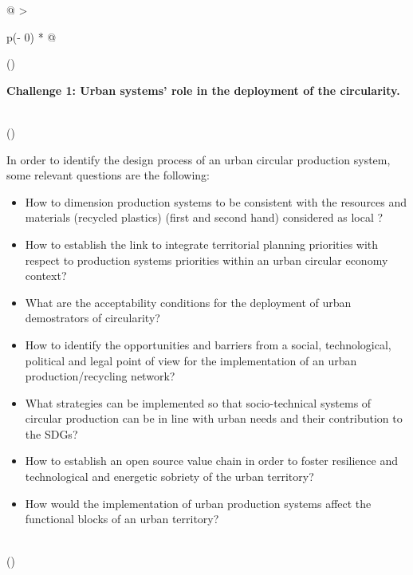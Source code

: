 \documentclass[
  12pt,
  a4paperpaper,
  onecolumn]{article}
\begin{document}
\begin{longtable}[]{@{}
  >{\raggedright\arraybackslash}p{(\columnwidth - 0\tabcolsep) * }@{}}
\toprule()
\begin{minipage}[b]{\linewidth}\raggedright
\textbf{Challenge 1: Urban systems' role in the deployment of the
circularity.}
\end{minipage} \\
\midrule()
\endhead
\begin{minipage}[t]{\linewidth}\raggedright
In order to identify the design process of an urban circular production
system, some relevant questions are the following:

\begin{itemize}
\item
  How to dimension production systems to be consistent with the
  resources and materials (recycled plastics) (first and second hand)
  considered as local ?
\item
  How to establish the link to integrate territorial planning priorities
  with respect to production systems priorities within an urban circular
  economy context?
\item
  What are the acceptability conditions for the deployment of urban
  demostrators of circularity?
\item
  How to identify the opportunities and barriers from a social,
  technological, political and legal point of view for the
  implementation of an urban production/recycling network?
\item
  What strategies can be implemented so that socio-technical systems of
  circular production can be in line with urban needs and their
  contribution to the SDGs?
\item
  How to establish an open source value chain in order to foster
  resilience and technological and energetic sobriety of the urban
  territory?
\item
  How would the implementation of urban production systems affect the
  functional blocks of an urban territory?
\end{itemize}
\end{minipage} \\
\bottomrule()
\end{longtable}
\end{document}

